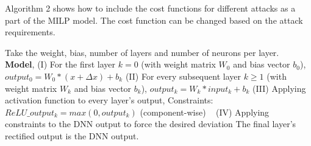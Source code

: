 Algorithm 2 shows how to include the cost functions for different attacks as a part of the MILP model. The cost function can be changed based on the attack requirements.
\begin{algorithm}
	Take the weight, bias, number of layers and number of neurons per layer. \\
	

	\textbf{Model}, \linebreak
	(I) For the first layer $k = 0$ (with weight matrix $W_0$ and bias vector $b_0$), $output_0 = W_0 * (x + \Delta x) + b_k$
	\linebreak
	(II) For every subsequent layer $k \geq 1$ (with weight matrix $W_k$ and bias vector $b_k$), $output_k = W_k * input_k + b_k$
	\linebreak
	(III) Applying activation function to every layer's output,
	\linebreak
	Constraints: $ReLU\_output_k = max(0, output_k)$ (component-wise) \
	\linebreak
	(IV) Applying constraints to the DNN output to force the desired deviation
	\linebreak
	The final layer's rectified output is the DNN output.
	

\end{algorithm}
